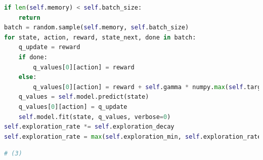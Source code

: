 \documentclass[10pt,a4paper]{article}
\begin{document}
\begin{lstlisting}[language=Python, caption=Expérience reaply de l'agent DQN]
if len(self.memory) < self.batch_size:
    return
batch = random.sample(self.memory, self.batch_size)
for state, action, reward, state_next, done in batch:
    q_update = reward
    if done:
        q_values[0][action] = reward
    else:
        q_values[0][action] = reward + self.gamma * numpy.max(self.target_model.predict(next_state
    q_values = self.model.predict(state)
    q_values[0][action] = q_update
    self.model.fit(state, q_values, verbose=0)
self.exploration_rate *= self.exploration_decay
self.exploration_rate = max(self.exploration_min, self.exploration_rate)
\end{lstlisting}

\begin{lstlisting}[language=Python]
# (3)
\end{lstlisting}
\end{document}
